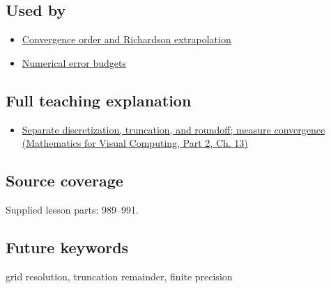 \subsection{Used by}\label{appendix-6b0648b2b8e8-used-by}

\hypertarget{appendix-6b0648b2b8e8-used-by}{}

\begin{itemize}
\tightlist
\item
  \hyperref[appendix-aca80b6bf17a]{Convergence order and Richardson extrapolation}
\item
  \hyperref[appendix-31b8c295e05f]{Numerical error budgets}
\end{itemize}

\subsection{Full teaching explanation}\label{appendix-6b0648b2b8e8-full-teaching-explanation}

\hypertarget{appendix-6b0648b2b8e8-full-teaching-explanation}{}

\begin{itemize}
\tightlist
\item
  \href{../02-Mathematics-for-Visual-Computing-P02/main.pdf\#02-foundations-ii-ch029-separate-discretization-truncation-and-roundoff-measure-convergence}{Separate discretization, truncation, and roundoff; measure convergence (Mathematics for Visual Computing, Part 2, Ch. 13)}
\end{itemize}

\subsection{Source coverage}\label{appendix-6b0648b2b8e8-source-coverage}

\hypertarget{appendix-6b0648b2b8e8-source-coverage}{}

Supplied lesson parts: 989--991.

\subsection{Future keywords}\label{appendix-6b0648b2b8e8-future-keywords}

\hypertarget{appendix-6b0648b2b8e8-future-keywords}{}

grid resolution, truncation remainder, finite precision
